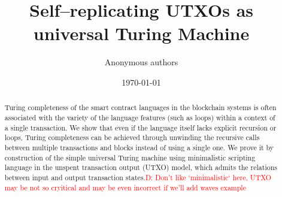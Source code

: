 \documentclass[runningheads]{llncs}
\newcommand{\dnote}[1]{\textcolor{red}{D: {#1}}}
\begin{document}
    \title{Self--replicating UTXOs as universal Turing Machine}

    \author{Anonymous authors}

    \date{\today}
    \maketitle

    \begin{abstract}
        Turing completeness of the smart contract languages in the blockchain
        systems is often associated with the variety of the language features
        (such as loops) within a context of a single transaction. We show that
        even if the language itself lacks explicit recursion or loops, Turing
        completeness can be achieved through unwinding the recursive calls between
        multiple transactions and blocks instead of using a single one. We prove
        it by construction of the simple universal Turing machine using
        minimalistic scripting language in the unspent transaction output (UTXO)
        model, which admits the relations between input and output transaction
        states.\dnote{Don't like `minimalistic` here, UTXO may be not so cryitical and may be even incorrect if we'll add waves example}
    \end{abstract}
\end{document}
